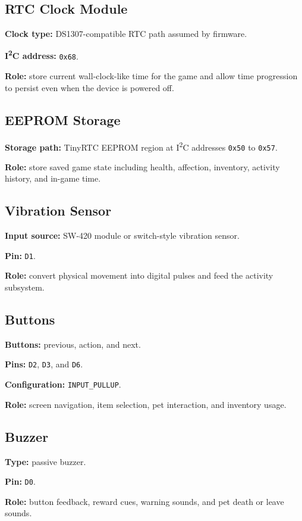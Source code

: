 \documentclass[conference]{IEEEtran}
\begin{document}
\subsection{RTC Clock Module}
\textbf{Clock type:} DS1307-compatible RTC path assumed by firmware.

\textbf{I\textsuperscript{2}C address:} \texttt{0x68}.

\textbf{Role:} store current wall-clock-like time for the game and allow time progression to persist even when the device is powered off.

\subsection{EEPROM Storage}
\textbf{Storage path:} TinyRTC EEPROM region at I\textsuperscript{2}C addresses \texttt{0x50} to \texttt{0x57}.

\textbf{Role:} store saved game state including health, affection, inventory, activity history, and in-game time.

\subsection{Vibration Sensor}
\textbf{Input source:} SW-420 module or switch-style vibration sensor.

\textbf{Pin:} \texttt{D1}.

\textbf{Role:} convert physical movement into digital pulses and feed the activity subsystem.

\subsection{Buttons}
\textbf{Buttons:} previous, action, and next.

\textbf{Pins:} \texttt{D2}, \texttt{D3}, and \texttt{D6}.

\textbf{Configuration:} \texttt{INPUT\_PULLUP}.

\textbf{Role:} screen navigation, item selection, pet interaction, and inventory usage.

\subsection{Buzzer}
\textbf{Type:} passive buzzer.

\textbf{Pin:} \texttt{D0}.

\textbf{Role:} button feedback, reward cues, warning sounds, and pet death or leave sounds.
\end{document}
